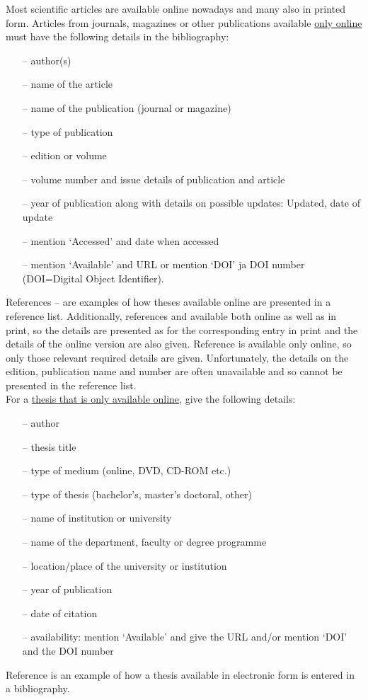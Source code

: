 \documentclass[english, 12pt, a4paper, elec, utf8, a-2b, online]{aaltothesis}
\begin{document}
Most scientific articles are available online nowadays and many also in printed 
form. Articles from journals, magazines or other publications available 
\underline{only online} must have the following details in the bibliography:
\begin{itemize}
\setlength{\itemsep}{-3pt}
\item[--]author(s)
\item[--]name of the article
\item[--]name of the publication (journal or magazine)
\item[--]type of publication
\item[--]edition or volume
\item[--]volume number and issue details of publication and article
\item[--]year of publication along with details on possible updates: Updated, 
date of update
\item[--]mention `Accessed' and date when accessed
\item[--]mention `Available' and URL or mention `DOI' ja DOI number (DOI=Digital
Object Identifier).
\end{itemize}
References \cite{Ribeiro}--\cite{kone} are examples of how theses available 
online are presented in a reference list. Additionally, references 
\cite{Ribeiro} and \cite{Stieber} available both online as well as in print, so 
the details are presented as for the corresponding entry in print and the 
details of the online version are also given. Reference \cite{kone} is 
available only online, so only those relevant required details are given.
Unfortunately, the details on the edition, publication name and number are 
often unavailable and so cannot be presented in the reference list.\\

\noindent
For a \underline{thesis that is only available online}, give the following 
details:
\begin{itemize}
\setlength{\itemsep}{-3pt}
\item[--]author
\item[--]thesis title
\item[--]type of medium (online, DVD, CD-ROM etc.)
\item[--]type of thesis (bachelor's, master's doctoral, other)
\item[--]name of institution or university
\item[--]name of the department, faculty or degree programme
\item[--]location/place of the university or institution
\item[--]year of publication
\item[--]date of citation
\item[--]availability: mention `Available' and give the URL and/or mention `DOI'
and the DOI number
\end{itemize}
Reference \cite{Adida} is an example of how a thesis available in electronic 
form is entered in a bibliography.\\
\end{document}
